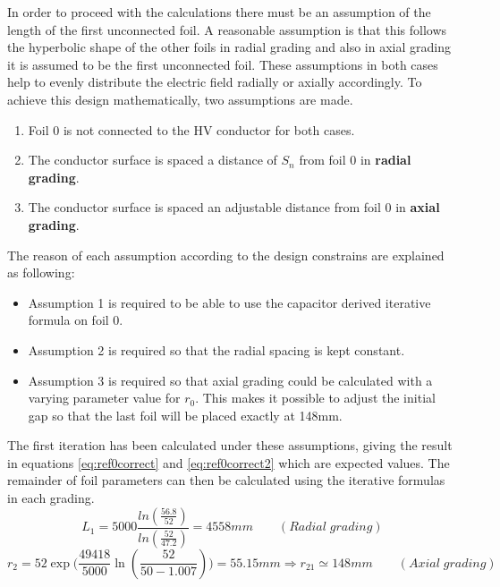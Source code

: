 In order to proceed with the calculations there must be an assumption of the length of the first unconnected foil.
A reasonable assumption is that this follows the hyperbolic shape of the other foils in radial grading and also in axial grading  it is assumed to be the first unconnected foil. These assumptions in both cases help to evenly distribute the electric field radially or axially accordingly.
To achieve this design mathematically, two assumptions are made.
\begin{enumerate}
\item Foil $0$ is not connected to the HV conductor for both cases.
\item The conductor surface is spaced a distance of $S_n$ from foil $0$ in \textbf{radial grading}.
\item The conductor surface is spaced an adjustable distance from foil $0$ in \textbf{axial grading}.
\end{enumerate}
The reason of each assumption  according to the design constrains are explained as following:
\begin{itemize}[noitemsep,topsep=0pt]
\item Assumption 1 is required to be able to use the capacitor derived iterative formula on foil 0.
\item Assumption 2 is required so that the radial spacing is kept constant. 
\item Assumption 3 is required so that axial grading could be calculated with a varying parameter value for $r_0$. This makes it possible to adjust the initial gap so that the last foil will be placed exactly at 148mm. 

\end{itemize}
The first iteration has been calculated under these assumptions, giving the result in equations \ref{eq:ref0correct} and \ref{eq:ref0correct2} which are expected values.
The remainder of foil parameters can then be calculated using the iterative formulas in each grading.
\begin{equation}
   \label{eq:ref0correct}
   L_{1}
   = 5000\displaystyle\frac{{ln(\displaystyle\frac{56.8}{52})} }{ln(\displaystyle\frac{52}{47.2})}
   = 4558mm \qquad (Radial \; grading)
\end{equation}
\begin{equation}
\label{eq:ref0correct2}
   r_2 = 52 \exp\big( \frac{49418}{5000} \ln(\frac{52}{50-1.007})\big)= 55.15mm \Longrightarrow r_{21}\simeq 148mm \qquad (Axial \; grading)
\end{equation}


